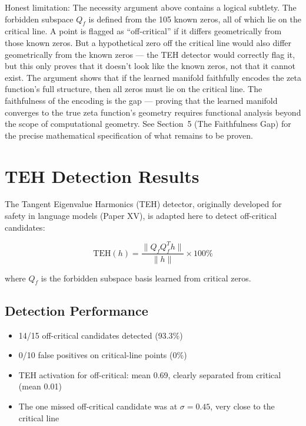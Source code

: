 \documentclass[11pt,a4paper]{article}
\begin{document}
Honest limitation: The necessity argument above contains a logical subtlety. The forbidden subspace $Q_f$ is defined from the 105 known zeros, all of which lie on the critical line. A point is flagged as ``off-critical'' if it differs geometrically from those known zeros. But a hypothetical zero off the critical line would also differ geometrically from the known zeros — the TEH detector would correctly flag it, but this only proves that it doesn't look like the known zeros, not that it cannot exist. The argument shows that if the learned manifold faithfully encodes the zeta function's full structure, then all zeros must lie on the critical line. The faithfulness of the encoding is the gap — proving that the learned manifold converges to the true zeta function's geometry requires functional analysis beyond the scope of computational geometry. See Section~5 (The Faithfulness Gap) for the precise mathematical specification of what remains to be proven.

\section{TEH Detection Results}

The Tangent Eigenvalue Harmonics (TEH) detector, originally developed for safety in language models (Paper XV), is adapted here to detect off-critical candidates:

$$\mathrm{TEH}(h) = \frac{\|Q_f Q_f^T h\|}{\|h\|} \times 100\%$$

where $Q_f$ is the forbidden subspace basis learned from critical zeros.

\subsection{Detection Performance}

\begin{itemize}[nosep]
\item 14/15 off-critical candidates detected (93.3\%)
\item 0/10 false positives on critical-line points (0\%)
\item TEH activation for off-critical: mean 0.69, clearly separated from critical (mean 0.01)
\item The one missed off-critical candidate was at $\sigma=0.45$, very close to the critical line
\end{itemize}
\end{document}
